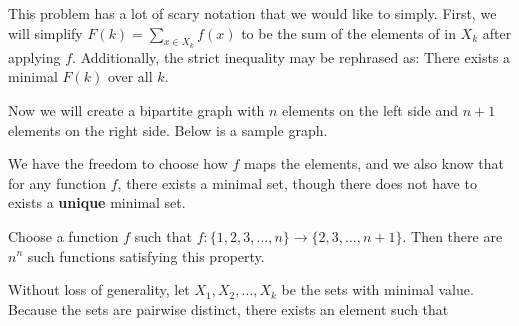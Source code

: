 \documentclass[11pt]{scrartcl}
\theoremstyle{plain} %
\theoremstyle{definition}
\theoremstyle{remark}
\theoremstyle{empty}
\theoremstyle{empty}
\theoremstyle{empty}
\theoremstyle{empty}
\theoremstyle{empty}
\theoremstyle{empty}
\begin{document}
\begin{solution}
  
  This problem has a lot of scary notation that we would like to simply. First, we will simplify $F(k) = \sum_{x\in X_k} f(x)$ to be the sum of the elements of in $X_k$ after applying $f$. Additionally, the strict inequality may be rephrased as: There exists a minimal $F(k)$ over all $k$. 
  
  Now we will create a bipartite graph with $n$ elements on the left side and $n+1$ elements on the right side. Below is a sample graph.
  
  
  \begin{center}
  \end{center}
  
  We have the freedom to choose how $f$ maps the elements, and we also know that for any function $f$, there exists a minimal set, though there does not have to exists a \textbf{unique} minimal set. 
  
  Choose a function $f$ such that $f: \{1,2,3,\ldots, n\} \to \{2,3,\ldots, n+1\}$. Then there are $n^n$ such functions satisfying this property. 
  
  Without loss of generality, let $X_1,X_2,\ldots, X_k$ be the sets with minimal value. Because the sets are pairwise distinct, there exists an element such that 
\end{solution}
\end{document}
